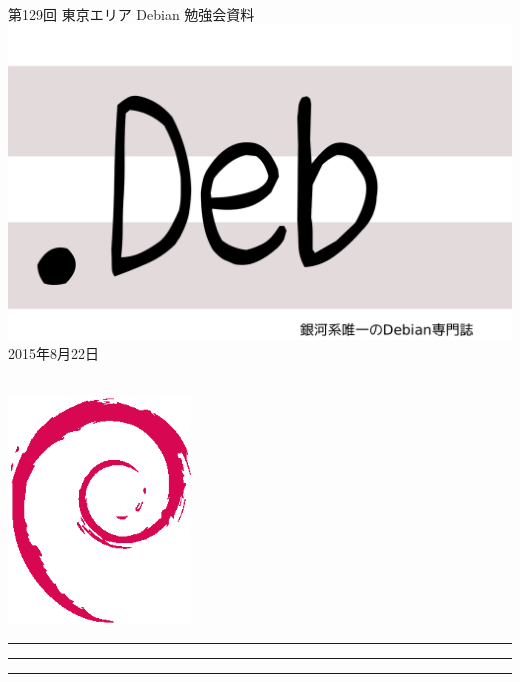 \documentclass[mingoth,a4paper]{jsarticle}
\newcommand{\debmtgyear}{2015}
\newcommand{\debmtgmonth}{8}
\newcommand{\debmtgdate}{22}
\newcommand{\debmtgnumber}{129}
\begin{document}
\begin{titlepage}
\thispagestyle{empty}

\vspace*{-2cm}
第\debmtgnumber{}回 東京エリア Debian 勉強会資料\\
\hspace*{-2cm}
\includegraphics{image2012-natsu/dotdeb.pdf}\\
\hfill{}\debmtgyear{}年\debmtgmonth{}月\debmtgdate{}日

\\

\vspace*{-2cm}
\hfill{}\includegraphics[height=6cm]{image200502/openlogo-nd.eps}
\end{titlepage}

\newpage

\begin{minipage}[b]{0.2\hsize}
 \colorbox{titleback}{}
\end{minipage}
\begin{minipage}[b]{0.8\hsize}
\hrule
\vspace{2mm}
\hrule
\begin{multicols}{2}
\tableofcontents
\end{multicols}
\vspace{2mm}
\hrule
\end{minipage}
\end{document}
